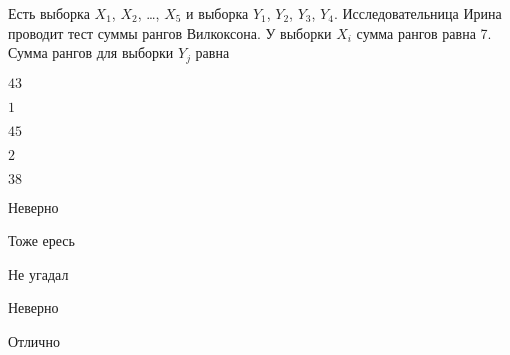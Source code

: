 
\begin{question}
Есть выборка \(X_1\), \(X_2\), \ldots, \(X_5\) и выборка \(Y_1\),
\(Y_2\), \(Y_3\), \(Y_4\). Исследовательница Ирина проводит тест суммы
рангов Вилкоксона. У выборки \(X_i\) сумма рангов равна 7. Сумма рангов
для выборки \(Y_j\) равна
\begin{answerlist}
  \item \(43\)
  \item \(1\)
  \item \(45\)
  \item \(2\)
  \item \(38\)
\end{answerlist}
\end{question}

\begin{solution}
\begin{answerlist}
  \item Неверно
  \item Тоже ересь
  \item Не угадал
  \item Неверно
  \item Отлично
\end{answerlist}
\end{solution}


